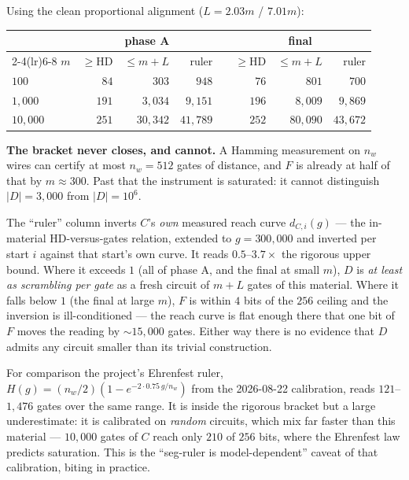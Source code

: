 \documentclass[11pt]{article}
\newcommand{\HD}{\mathrm{HD}}
\begin{document}
Using the clean proportional alignment ($L=2.03m$ / $7.01m$):
\begin{center}\small
\begin{tabular}{@{}lrrrcrrr@{}}
\toprule
& \multicolumn{3}{c}{phase A} & & \multicolumn{3}{c}{final} \\
\cmidrule(lr){2-4}\cmidrule(lr){6-8}
$m$ & $\ge \HD$ & $\le m{+}L$ & ruler & & $\ge \HD$ & $\le m{+}L$ & ruler \\
\midrule
$100$    & $84$  & $303$    & $948$    & & $76$  & $801$    & $700$ \\
$1{,}000$  & $191$ & $3{,}034$  & $9{,}151$  & & $196$ & $8{,}009$  & $9{,}869$ \\
$10{,}000$ & $251$ & $30{,}342$ & $41{,}789$ & & $252$ & $80{,}090$ & $43{,}672$ \\
\bottomrule
\end{tabular}
\end{center}

\textbf{The bracket never closes, and cannot.} A Hamming measurement on $n_w$ wires can certify at most
$n_w=512$ gates of distance, and $F$ is already at half of that by $m\approx300$. Past that the
instrument is saturated: it cannot distinguish $|D|=3{,}000$ from $|D|=10^6$.

The ``ruler'' column inverts $C$'s \emph{own} measured reach curve $d_{C,i}(g)$ --- the in-material
HD-versus-gates relation, extended to $g=300{,}000$ and inverted per start $i$ against that start's own
curve. It reads $0.5$--$3.7\times$ the rigorous upper bound. Where it exceeds $1$ (all of phase A, and
the final at small $m$), $D$ is \emph{at least as scrambling per gate} as a fresh circuit of $m+L$ gates
of this material. Where it falls below $1$ (the final at large $m$), $F$ is within $4$ bits of the $256$
ceiling and the inversion is ill-conditioned --- the reach curve is flat enough there that one bit of
$F$ moves the reading by ${\sim}15{,}000$ gates. Either way there is no evidence that $D$ admits any
circuit smaller than its trivial construction.

For comparison the project's Ehrenfest ruler, $H(g)=(n_w/2)(1-e^{-2\cdot0.75\,g/n_w})$ from the
2026-08-22 calibration, reads $121$--$1{,}476$ gates over the same range. It is inside the rigorous
bracket but a large underestimate: it is calibrated on \emph{random} circuits, which mix far faster than
this material --- $10{,}000$ gates of $C$ reach only $210$ of $256$ bits, where the Ehrenfest law
predicts saturation. This is the ``seg-ruler is model-dependent'' caveat of that calibration, biting in
practice.
\end{document}
